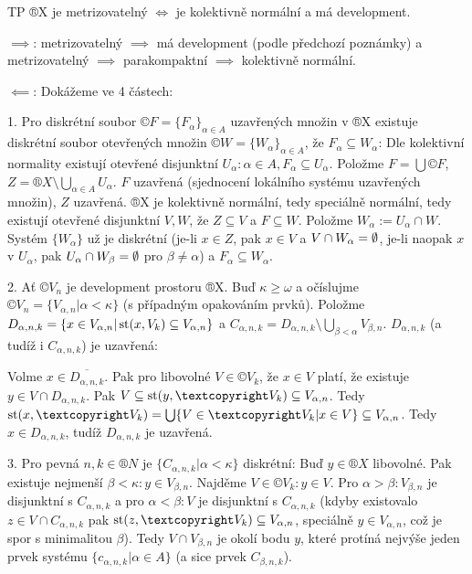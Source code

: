 \documentclass[12pt]{article}                   %
\begin{document}
    \begin{veta}[Bing]
        TP ®X je metrizovatelný $\Leftrightarrow$ je kolektivně normální a má development.

        \begin{dukazin}
            $\implies$: metrizovatelný $\implies$ má development (podle předchozí poznámky) a metrizovatelný $\implies$ parakompaktní $\implies$ kolektivně normální.


            $\impliedby$: Dokážeme ve 4 částech:

            1. Pro diskrétní soubor $©F = \{F_\alpha\}_{\alpha \in A}$ uzavřených množin v ®X existuje diskrétní soubor otevřených množin $©W = \{W_\alpha\}_{\alpha \in A}$, že $F_\alpha \subseteq W_\alpha$: Dle kolektivní normality existují otevřené disjunktní $U_\alpha: \alpha \in A, F_\alpha \subseteq U_\alpha$. Položme $F = \bigcup ©F$, $Z = ®X \setminus \bigcup_{\alpha \in A} U_\alpha$. $F$ uzavřená (sjednocení lokálního systému uzavřených množin), $Z$ uzavřená. ®X je kolektivně normální, tedy speciálně normální, tedy existují otevřené disjunktní $V, W$, že $Z \subseteq V$ a $F \subseteq W$. Položme $W_\alpha := U_\alpha \cap W$. Systém $\{W_\alpha\}$ už je diskrétní (je-li $x \in Z$, pak $x \in V$ a $V \cap W_\alpha = \emptyset$, je-li naopak $x$ v $U_\alpha$, pak $U_\alpha \cap W_\beta = \emptyset$ pro $\beta ≠ \alpha$) a $F_\alpha \subseteq W_\alpha$.

            2. Ať $©V_n$ je development prostoru ®X. Buď $\kappa ≥ \omega$ a očíslujme $©V_n = \{V_{\alpha, n} | \alpha < \kappa\}$ (s případným opakováním prvků). Položme $D_{\alpha, n, k} = \{x \in V_{\alpha, n} | \operatorname{st}(x, V_k) \subseteq V_{\alpha, n}\}$ a $C_{\alpha, n, k} = D_{\alpha, n, k} \setminus \bigcup_{\beta < \alpha} V_{\beta, n}$. $D_{\alpha, n, k}$ (a tudíž i $C_{\alpha, n, k}$) je uzavřená:

                Volme $x \in \overline{D_{\alpha, n, k}}$. Pak pro libovolné $V \in ©V_k$, že $x \in V$ platí, že existuje $y \in V \cap D_{\alpha, n, k}$. Pak $V \subseteq \st(y, ©V_k) \subseteq V_{\alpha, n}$. Tedy $\st(x, ©V_k) = \bigcup\{V \in ©V_k | x \in V\} \subseteq V_{\alpha, n}$. Tedy $x \in D_{\alpha, n, k}$, tudíž $D_{\alpha, n, k}$ je uzavřená.

            3. Pro pevná $n, k \in ®N$ je $\{C_{\alpha, n, k} | \alpha < \kappa\}$ diskrétní: Buď $y \in ®X$ libovolné. Pak existuje nejmenší $\beta < \kappa: y \in V_{\beta, n}$. Najděme $V \in ©V_k: y \in V$. Pro $\alpha > \beta: V_{\beta, n}$ je disjunktní s $C_{\alpha, n, k}$ a pro $\alpha < \beta: V$ je disjunktní s $C_{\alpha, n, k}$ (kdyby existovalo $z \in V \cap C_{\alpha, n, k}$ pak $\st(z, ©V_k) \subseteq V_{\alpha, n}$, speciálně $y \in V_{\alpha, n}$, což je spor s minimalitou $\beta$). Tedy $V \cap V_{\beta, n}$ je okolí bodu $y$, které protíná nejvýše jeden prvek systému $\{c_{\alpha, n, k} | \alpha \in A\}$ (a sice prvek $C_{\beta, n, k}$).


\end{dukazin}
\end{veta}
\end{document}
